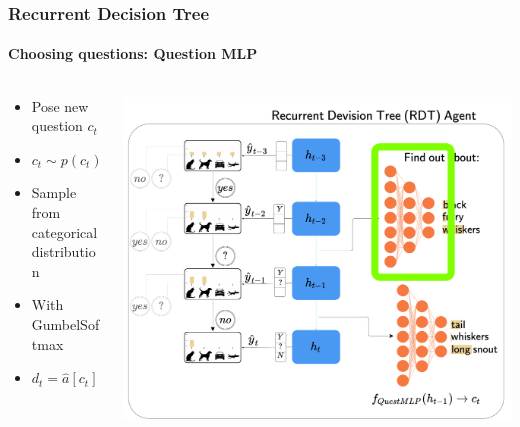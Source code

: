 \documentclass[9pt]{beamer}
\begin{document}
\begin{frame}
\frametitle{Recurrent Decision Tree}
\framesubtitle{Choosing questions: Question MLP}
\begin{columns}[T]
\begin{column}{.5\textwidth}
\begin{itemize}
	\item Pose new question $c_t$
	\item $c_t \sim p(c_t)$
	\item Sample from categorical distribution
	\item With GumbelSoftmax
	\item $d_t = \hat{a}\left[c_t\right]$
\end{itemize}
\end{column}
\begin{column}{.5\textwidth}
\includegraphics[width=\textwidth]{images/urdtc_parts_questMLP.pdf}
\end{column}
\end{columns}
\end{frame}
\end{document}
